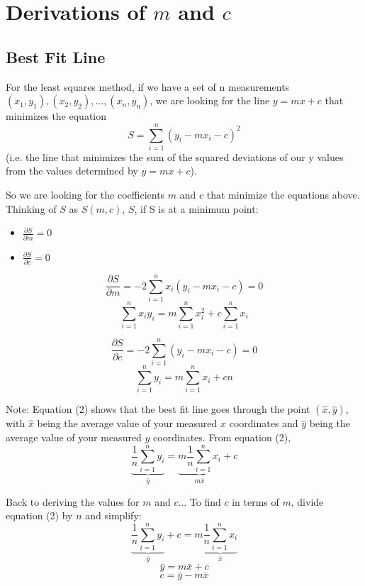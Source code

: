 \documentclass{article}
\begin{document}
\section{Derivations of $m$ and $c$}
\subsection{Best Fit Line}
For the least squares method, if we have a set of $\mathrm{n}$ measurements $(x_1,y_1),(x_2,y_2),...,(x_n,y_n)$, we are looking for the line $y = mx + c$ that minimizes the equation
$$S = \sum\limits_{i = 1}^n {{{\left( {{y_i} - m{x_i} - c} \right)}^2}}$$
(i.e. the line that minimizes the sum of the squared deviations of our y values from the values determined by $y=mx+c$).

So we are looking for the coefficients $m$ and $c$ that minimize the equations above. Thinking of $S$ as $S(m,c)$, $S$, if S is at a minimum point:
\begin{itemize}
	\item $\frac{\partial S}{\partial m} = 0$
	\item $\frac{\partial S}{\partial c} = 0$

\end{itemize}



$$\frac{{\partial S}}{{\partial m}} =  - 2\sum\limits_{i = 1}^n {{x_i}\left( {{y_i} - m{x_i} - c} \right)}  = 0$$
\begin{equation}
\sum\limits_{i = 1}^n {{x_i}{y_i} = m\sum\limits_{i = 1}^n {x_i^2}  + c\sum\limits_{i = 1}^n {{x_i}} } 
\end{equation}

$$\frac{{\partial S}}{{\partial c}} =  - 2\sum\limits_{i = 1}^n {\left( {{y_i} - m{x_i} - c} \right)}  = 0$$
\begin{equation}
\sum\limits_{i = 1}^n {{y_i}}  = m\sum\limits_{i = 1}^n {{x_i}}  + cn
\end{equation}

Note: Equation (2) shows that the best fit line goes through the point $(\hat{x},\hat{y})$, with $\hat{x}$ being the average value of your measured $x$ coordinates
and $\hat{y}$ being the average value of your measured $y$ coordinates. From equation (2),
$$\underbrace {\frac{1}{n}\sum\limits_{i = 1}^n {{y_i}} }_{\bar y} = \underbrace {m\frac{1}{n}\sum\limits_{i = 1}^n {{x_i}} }_{m\bar x} + c$$

Back to deriving the values for $m$ and $c$... To find $c$ in terms of $m$, divide equation (2) by $n$ and simplify:
$$\underbrace {\frac{1}{n}\sum\limits_{i = 1}^n {{y_i}} }_{\bar y} + c = m\underbrace {\frac{1}{n}\sum\limits_{i = 1}^n {{x_i}} }_{\bar x}$$
$$\bar y = m\bar x + c $$
\begin{equation}
c = \bar{y} - m \bar{x}
\end{equation}
\end{document}
